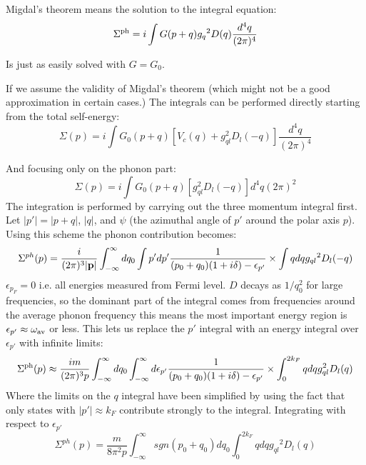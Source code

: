\documentclass{article}
\def\p{{\bf p}}
\begin{document}
Migdal's theorem means the solution to the integral equation:
\begin{equation}
\Sigma^{\rm ph} = i \int G(p+q){g_{q}}^{2}D(q)\frac{d^{4}q}{(2\pi)^{4}}
\end{equation}

Is just as easily solved with $G=G_{0}$.

If we assume the validity of Migdal's theorem (which might not be a good approximation in certain cases.)
The integrals can be performed directly starting from the total self-energy:
%
\begin{equation}
\Sigma(p) = i\int G_{0}(p+q)[V_{c}(q) + g^{2}_{ql}D_{l}(-q)]\frac{d^{4}q}{(2\pi)^{4}}
\end{equation}
%

And focusing only on the phonon part:
%
\begin{equation}
\Sigma(p) = i\int G_{0}(p+q)[g^{2}_{ql}D_{l}(-q)]{d^{4}q}{(2\pi)^{2}}
\end{equation}
%
The integration is performed by carrying out the three momentum integral first.
Let $|p'| = |p+q|$, $|q|$, and $\psi$ (the azimuthal angle of $p'$ around the polar
axis $p$). Using this scheme the phonon contribution becomes:
%
\begin{equation}
\Sigma^{ph}(p) = \frac{i}{(2\pi)^{3}|\p|}\int_{-\infty}^{\infty}dq_{0}\int p' dp' \frac{1}{(p_0+q_0)(1+i\delta)-\epsilon_{p'}}\times\int q dq {g_{ql}}^{2}D_{l}(-q) 
\end{equation}
%
$\epsilon_{p_{F}}=0$ i.e. all energies measured from Fermi level.  $D$ decays as $1/q^{2}_0$ for large frequencies,
so the dominant part of the integral comes from frequencies around the average phonon frequency this means
the most important energy region is $\epsilon_{p'}\approx \omega_{\rm av}$ or less. This lets us replace
the $p'$ integral with an energy integral over $\epsilon_{p'}$ with infinite limits:
%
\begin{equation}
\Sigma^{\rm ph}(p) \approx \frac{im}{(2\pi)^{3}p} \int_{-\infty}^{\infty} dq_{0} \int_{-\infty}^{\infty}d \epsilon_{p'}
\frac{1}{(p_0+q_0)(1 + i\delta)-\epsilon_{p'}}\times\int_{0}^{2k_{F}}qdq{g_{ql}^{2}}D_{l}(q)
\end{equation}
%
Where the limits on the $q$ integral have been simplified by using the fact that 
only states with $|p'|\approx k_{F}$ contribute strongly to the integral. Integrating
with respect to $\epsilon_{p'}$
%
\begin{equation}
\label{eq:migseq}
\Sigma^{ph} (p) = \frac{m}{8\pi^{2}p}\int_{-\infty}^{\infty} sgn(p_0+q_0)dq_{0}\int_{0}^{2k_{F}}q dq {g_{ql}}^{2}D_{l}(q)
\end{equation}
\end{document}
